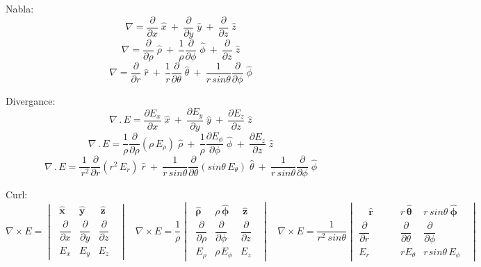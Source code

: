 \par
Nabla:
$$ \nabla = \frac{\partial}{\partial x}\;\hat{x} ~+~ \frac{\partial}{\partial y}\;\hat{y} ~+~ \frac{\partial}{\partial z}\;\hat{z} $$
$$ \nabla = \frac{\partial}{\partial \rho}\;\hat{\rho} ~+~ \frac{1}{\rho}\frac{\partial}{\partial \phi}\;\hat{\phi} ~+~ \frac{\partial}{\partial z}\;\hat{z} $$
$$ \nabla = \frac{\partial}{\partial r}\;\hat{r} ~+~ \frac{1}{r}\frac{\partial}{\partial \theta}\;\hat{\theta} ~+~ \frac{1}{r\,sin\theta}\frac{\partial}{\partial \phi}\;\hat{\phi} $$
\par
Divergance:
$$ \nabla\,.\,E = \frac{\partial E_x}{\partial x}\;\hat{x} ~+~ \frac{\partial E_y}{\partial y}\;\hat{y} ~+~ \frac{\partial E_z}{\partial z}\;\hat{z} $$
$$ \nabla\,.\,E = \frac{1}{\rho} \frac{\partial}{\partial \rho} (\rho \,E_{\rho})\;\hat{\rho} ~+~ \frac{1}{\rho}\frac{\partial E_{\phi}}{\partial \phi}\;\hat{\phi} ~+~ \frac{\partial E_{z}}{\partial z}\;\hat{z} $$
$$ \nabla\,.\,E = \frac {1}{\,r^2}\frac{\partial}{\partial r} (r^2 \, E_r)\;\hat{r} ~+~ \frac{1}{r\,sin\theta}\frac{\partial}{\partial \theta}(sin\theta\, E_{\theta})\;\hat{\theta} ~+~ \frac{1}{r\,sin\theta}\frac{\partial}{\partial \phi}\;\hat{\phi} $$
\par
Curl:
$$ \nabla \times E =  \begin{vmatrix}
\;\hat{\boldsymbol{x}} & \hat{\boldsymbol{y}} & ~\hat{\boldsymbol{z}}\;\;\\[0.25em]
\;\dfrac{\partial}{\partial x} & \dfrac{\partial}{\partial y} & \dfrac{\partial}{\partial z}\;\;\\[0.8em]
\;E_x & E_y & E_z\;\;
\end{vmatrix} ~~~~
 \nabla \times E = \frac{1}{\rho} \begin{vmatrix}
\;\hat{\boldsymbol{\rho}} & \rho\,\hat{\boldsymbol{\phi}} & ~\hat{\boldsymbol{z}}\;\;\\[0.25em]
\;\dfrac{\partial}{\partial \rho} & \dfrac{\partial}{\partial \phi} & \dfrac{\partial}{\partial z}\;\;\\[0.8em]
\;E_{\rho} & \rho\hspace{1pt}E_{\phi} & E_z\;\;
\end{vmatrix} ~~~~
 \nabla \times E = \frac{1}{r^2~ sin \theta} \begin{vmatrix}
\quad\hat{\boldsymbol{r}}\quad\quad & r \, \hat{\boldsymbol{\theta}} & r\, sin \theta \:\hat{\boldsymbol{\phi}}\;\;\\[0.25em]
\dfrac{\partial}{\partial r} & \dfrac{\partial}{\partial \theta} & \dfrac{\partial}{\partial \phi}\;\;\\[0.8em]
E_{r} & r E_{\theta} & r \hspace{1pt} sin \theta \, E_{\phi}\;\;
\end{vmatrix}$$
\par
\begin{minipage}[b]{.49\textwidth}
\lipsum[1-2]
\end{minipage}%
\hspace{.02\textwidth}
\begin{minipage}[b]{.49\textwidth}
\lipsum[1-2]
\end{minipage}%
\par
\setlength{\parindent}{0.0cm} %
